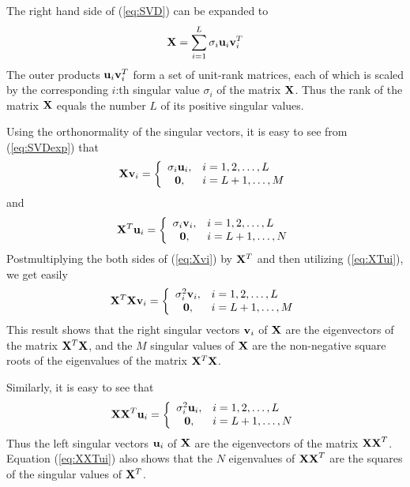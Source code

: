 \begin{enumerate}
\begin{solution}
    The right hand side of (\ref{eq:SVD}) can be expanded to
    \begin{equation}
      {\bf X} = \sum_{i=1}^L \sigma_i {\bf u}_i {\bf v}_i^T
      \label{eq:SVDexp}
    \end{equation}
    The outer products ${\bf u}_i {\bf v}_i^T$ form a set of unit-rank matrices, each
    of which is scaled by the corresponding $i$:th singular value $\sigma_i$ of the
    matrix ${\bf X}$. Thus the rank of the matrix ${\bf X}$ equals the number $L$ of
    its positive singular values.

    Using the orthonormality of the singular vectors, it is easy to see from
    (\ref{eq:SVDexp}) that 
    \begin{equation}
      {\bf Xv}_i = \left\{ \begin{array}{cl}
          \sigma_i {\bf u}_i, & i=1,2,\ldots,L \\
          {\bf 0}, & i=L+1,\ldots,M 
        \end{array} \right.
      \label{eq:Xvi}
    \end{equation}
    and 
    \begin{equation}
      {\bf X}^T{\bf u}_i = \left\{ \begin{array}{cl}
          \sigma_i {\bf v}_i, & i=1,2,\ldots,L \\
          {\bf 0}, & i=L+1,\ldots,N 
        \end{array} \right.
      \label{eq:XTui}
    \end{equation}
    Postmultiplying the both sides of (\ref{eq:Xvi}) by ${\bf X}^T$ and then utilizing
    (\ref{eq:XTui}), we get easily
    \begin{equation}
      {\bf X}^T{\bf Xv}_i = \left\{ \begin{array}{cl}
          \sigma_i^2 {\bf v}_i, & i=1,2,\ldots,L \\
          {\bf 0}, & i=L+1,\ldots,M 
        \end{array} \right.
      \label{eq:XTXvi}
    \end{equation}
    This result shows that the right singular vectors ${\bf v}_i$ of ${\bf X}$ are the
    eigenvectors of the matrix ${\bf X}^T{\bf X}$, and the $M$ singular values of 
    ${\bf X}$ are the non-negative square roots of the eigenvalues of the matrix
    ${\bf X}^T{\bf X}$.

    Similarly, it is easy to see that
    \begin{equation}
      {\bf XX}^T{\bf u}_i = \left\{ \begin{array}{cl}
          \sigma_i^2 {\bf u}_i, & i=1,2,\ldots,L \\
          {\bf 0}, & i=L+1,\ldots,N 
        \end{array} \right.
      \label{eq:XXTui}
    \end{equation}
    Thus the left singular vectors ${\bf u}_i$ of ${\bf X}$ are the eigenvectors of the
    matrix ${\bf XX}^T$. Equation (\ref{eq:XXTui}) also shows that the $N$ eigenvalues of 
    ${\bf XX}^T$ are the squares of the singular values of ${\bf X}^T$.


\end{solution}
\end{enumerate}
